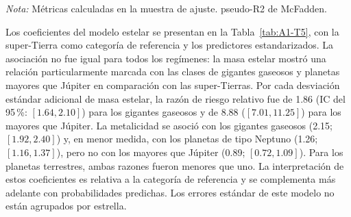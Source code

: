 \begin{table}[htbp]
    \centering
    \caption{Análisis I: comparación de los modelos multinomiales. Las diferencias son respecto al modelo base B0.}
    \label{tab:A1-T4}
    \small
    \par\smallskip
    {\footnotesize\textit{Nota:} Métricas calculadas en la muestra de ajuste. pseudo-R2 de McFadden.}
\end{table}

Los coeficientes del modelo estelar se presentan en la Tabla~\ref{tab:A1-T5}, con la super-Tierra como categoría de referencia y los predictores estandarizados. La asociación no fue igual para todos los regímenes: la masa estelar mostró una relación particularmente marcada con las clases de gigantes gaseosos y planetas mayores que Júpiter en comparación con las super-Tierras. Por cada desviación estándar adicional de masa estelar, la razón de riesgo relativo fue de 1.86 (IC del 95\,\%: $[1.64, 2.10]$) para los gigantes gaseosos y de 8.88 ($[7.01, 11.25]$) para los mayores que Júpiter. La metalicidad se asoció con los gigantes gaseosos (2.15; $[1.92, 2.40]$) y, en menor medida, con los planetas de tipo Neptuno (1.26; $[1.16, 1.37]$), pero no con los mayores que Júpiter (0.89; $[0.72, 1.09]$). Para los planetas terrestres, ambas razones fueron menores que uno. La interpretación de estos coeficientes es relativa a la categoría de referencia y se complementa más adelante con probabilidades predichas. Los errores estándar de este modelo no están agrupados por estrella.

